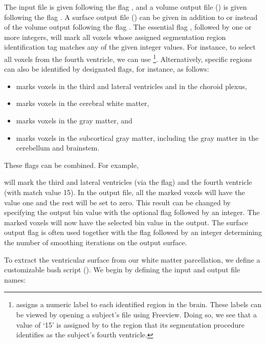 The input file is given following the flag , and a volume
output file () is given following the flag . A
surface output file () can be given in addition to or
instead of the volume output following the flag . The
essential flag , followed by one or more integers, will mark
all voxels whose assigned segmentation region identification tag matches any of 
the given integer values. For instance, to select all voxels from the fourth 
ventricle, we can use \footnote{{\freesurfer} assigns a numeric 
label to each identified region in the brain. These labels can be viewed by opening a subject's  file 
using Freeview.  Doing so, we see that a value of `15' is assigned by 
{\freesurfer} to the region that its segmentation procedure identifies as 
the subject's fourth ventricle.}. 
Alternatively, specific regions can 
also be identified by designated flags, for instance, as follows:
\begin{itemize}
\item {} marks voxels in the third and lateral ventricles and in the choroid plexus,
\item {} marks voxels in the cerebral white matter,
\item {} marks voxels in the gray matter, and  
\item {} marks voxels in the subcortical gray matter, including the gray matter in the cerebellum and brainstem.  
\end{itemize}
These flags can be combined. For example,

\noindent will mark the third and lateral ventricles (via the
 flag) and the fourth ventricle (with match value
15). In the output file, all the marked voxels will have the value one
and the rest will be set to zero. This result can be changed by specifying the
output bin value with the optional flag  followed by an
integer. The marked voxels will now have the selected bin value in the
output. The surface output flag  is often used together
with the flag  followed by an integer determining
the number of smoothing iterations on the output surface. 

To extract the ventricular surface from our white matter parcellation,
we define a customizable bash script (). We begin by defining the input and output file names:



